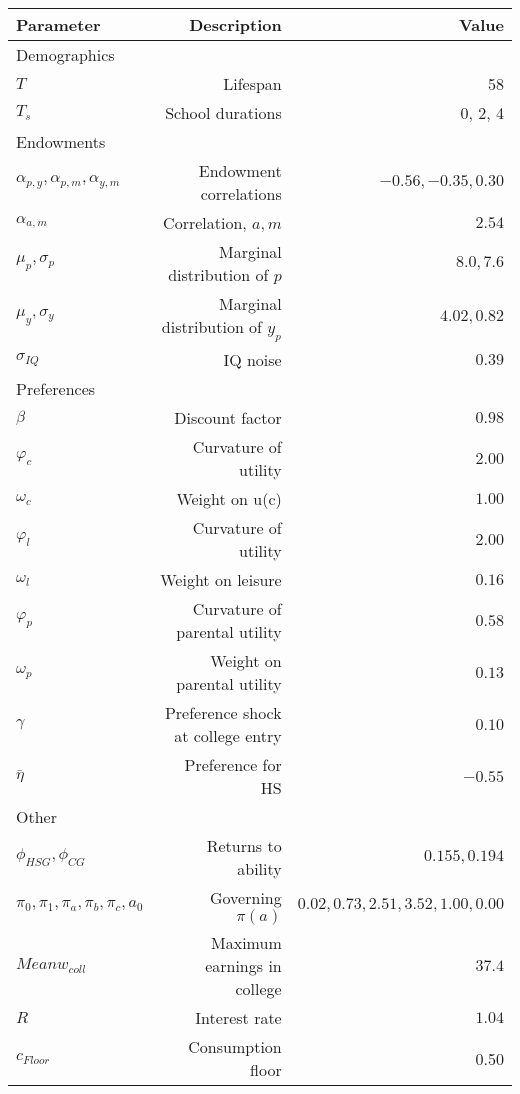\begin{tabular}{lrr}
\hline
Parameter & Description  & Value  \\
\hline
Demographics &   &   \\
$T$ & Lifespan  & 58  \\
$T_{s}$ & School durations  & 0, 2, 4  \\
Endowments &   &   \\
$\alpha_{p,y}, \alpha_{p,m}, \alpha_{y,m}$ & Endowment correlations  & $-0.56, -0.35, 0.30$  \\
$\alpha_{a,m}$ & Correlation, $a,m$  & $2.54$  \\
$\mu_{p}, \sigma_{p}$ & Marginal distribution of $p$  & $8.0, 7.6$  \\
$\mu_{y}, \sigma_{y}$ & Marginal distribution of $y_{p}$  & $4.02, 0.82$  \\
$\sigma_{IQ}$ & IQ noise  & $0.39$  \\
Preferences &   &   \\
$\beta$ & Discount factor  & $0.98$  \\
$\varphi_{c}$ & Curvature of utility  & $2.00$  \\
$\omega_{c}$ & Weight on u(c)  & $1.00$  \\
$\varphi_{l}$ & Curvature of utility  & $2.00$  \\
$\omega_{l}$ & Weight on leisure  & $0.16$  \\
$\varphi_{p}$ & Curvature of parental utility  & $0.58$  \\
$\omega_{p}$ & Weight on parental utility  & $0.13$  \\
$\gamma$ & Preference shock at college entry  & $0.10$  \\
$\bar{\eta}$ & Preference for HS  & $-0.55$  \\
Other &   &   \\
$\phi_{HSG}, \phi_{CG}$ & Returns to ability  & $0.155, 0.194$  \\
$\pi_{0}, \pi_{1}, \pi_{a}, \pi_{b}, \pi_{c}, a_{0}$ & Governing $\pi(a)$  & $0.02, 0.73, 2.51, 3.52, 1.00, 0.00$  \\
$Mean w_{coll}$ & Maximum earnings in college  & $37.4$  \\
$R$ & Interest rate  & $1.04$  \\
$c_{Floor}$ & Consumption floor  & 0.50  \\
\hline
\end{tabular}%
